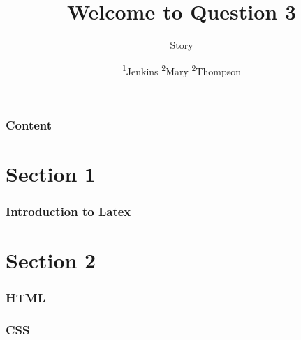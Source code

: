 \documentclass{beamer}
\title[Question 3]
{Welcome to Question 3}
\subtitle{Story}
\author{\textsuperscript{1}Jenkins \textsuperscript{2}Mary \textsuperscript{2}Thompson}
\institute{\textsuperscript{1}MIT \textsuperscript{2}VIT}
\begin{document}
	\maketitle
	\begin{frame}
		\frametitle{Content}
		\tableofcontents
	\end{frame}
	\section{Section 1}
	\begin{frame}
		\frametitle{Introduction to Latex}
	\end{frame}
	\section{Section 2}
	\frame{\tableofcontents}
	\begin{frame}
		\frametitle{HTML} 
	\end{frame}
	\frame{\tableofcontents}
	\begin{frame}
		\frametitle{CSS}
	\end{frame}
\end{document}
